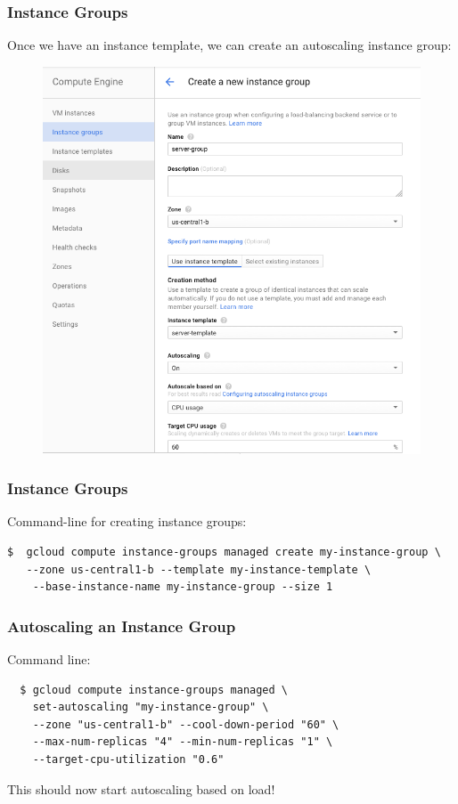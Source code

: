 \documentclass[9pt]{beamer}
\begin{document}
\begin{frame}[fragile]
\frametitle{Instance Groups}
Once we have an instance template, we can create an autoscaling instance group:
\begin{figure}
    \includegraphics[scale=0.2]{figures/Autoscale.png}
\end{figure}
\end{frame}

\begin{frame}[fragile]
\frametitle{Instance Groups}
Command-line for creating instance groups:
\begin{verbatim}
$  gcloud compute instance-groups managed create my-instance-group \
   --zone us-central1-b --template my-instance-template \
    --base-instance-name my-instance-group --size 1
\end{verbatim}
\end{frame}

\begin{frame}[fragile]
\frametitle{Autoscaling an Instance Group}
Command line:
\begin{verbatim}
  $ gcloud compute instance-groups managed \
    set-autoscaling "my-instance-group" \
    --zone "us-central1-b" --cool-down-period "60" \
    --max-num-replicas "4" --min-num-replicas "1" \
    --target-cpu-utilization "0.6"
\end{verbatim}
This should now start autoscaling based on load!
\end{frame}
\end{document}
